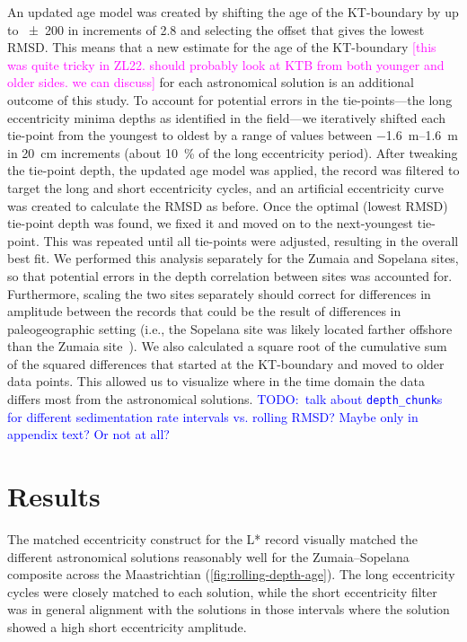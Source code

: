 \documentclass[draft]{agujournal2019}
\newcommand{\rez}{\textcolor{magenta}}
\newcommand{\ijk}{\textcolor{blue}}
\begin{document}
An updated age model was created by shifting the age of the \gls{KT}-boundary
by up to \qty{\pm200}{\kiloyear} in increments of \qty{2.8}{\kiloyear}
and selecting the offset that gives the lowest \gls{RMSD}.
This means that a new estimate for the age of the \gls{KT}-boundary
\rez{[this was quite tricky in ZL22. should probably look
at KTB from both younger and older sides. we can discuss]}
for each astronomical solution is an additional outcome of this study.
To account for potential errors in the tie-points---the long eccentricity minima depths as identified in the field---we iteratively shifted each tie-point from the youngest to oldest by a range of values between \qtyrange[range-phrase=~to~]{-1.6}{1.6}{\metre} in \qty{20}{\centi\metre} increments (about \qty{10}{\percent} of the long eccentricity period).
After tweaking the tie-point depth, the updated age model was applied, the record was filtered to target the long and short eccentricity cycles, and an artificial eccentricity curve was created to calculate the \gls{RMSD} as before.
Once the optimal (lowest \gls{RMSD}) tie-point depth was found, we fixed it and moved on to the next-youngest tie-point.
This was repeated until all tie-points were adjusted, resulting in the overall best fit.
We performed this analysis separately for the Zumaia and Sopelana sites, so that potential errors in the depth correlation between sites was accounted for.
Furthermore,  scaling the two sites separately should correct for differences in amplitude between the records that could be the result of differences in paleogeographic setting (i.e., the Sopelana site was likely located farther offshore than the Zumaia site~\cite{Batenburg2014}).
We also calculated a square root of the cumulative sum of the squared differences that started at the \gls{KT}-boundary and moved to older data points.
This allowed us to visualize where in the time domain the data differs most from the astronomical solutions.
\ijk{TODO:\ talk about \texttt{depth\_chunk}s for different sedimentation rate intervals vs. rolling RMSD? Maybe only in appendix text? Or not at all?}

\section{Results}\label{sec:results}

The matched eccentricity construct for the \gls{L*} record visually matched the different astronomical solutions reasonably well for the Zumaia--Sopelana composite across the Maastrichtian (\cref{fig:rolling-depth-age}). %
The long eccentricity cycles were closely matched to each solution, while the short eccentricity filter was in general alignment with the solutions in those intervals where the solution showed a high short eccentricity amplitude.
\end{document}
